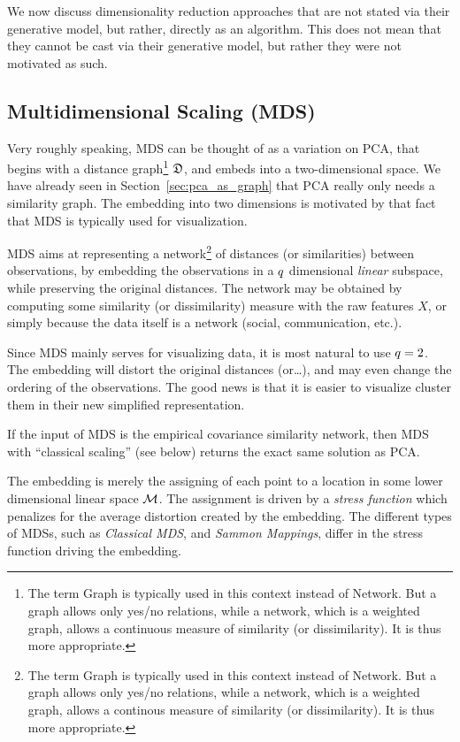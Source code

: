 \documentclass[12pt,a4paper]{article}
\begin{document}
We now discuss dimensionality reduction approaches that are not stated via their generative model, but rather, directly as an algorithm.
This does not mean that they cannot be cast via their generative model, but rather they were not motivated as such.



\subsection{Multidimensional Scaling (MDS)}
\label{sec:mds}

Very roughly speaking, MDS can be thought of as a variation on PCA, that begins with a distance graph\footnote{The term Graph is typically used in this context instead of Network. But a graph allows only yes/no relations, while a network, which is a weighted graph, allows a continuous measure of similarity (or dissimilarity). It is thus more appropriate.} $\mathfrak{D}$, and embeds into a two-dimensional space.
We have already seen in Section~\ref{sec:pca_as_graph} that PCA really only needs a similarity graph. 
The embedding into two dimensions is motivated by that fact that MDS is typically used for visualization. 

MDS aims at representing a network\footnote{The term Graph is typically used in this context instead of Network. But a graph allows only yes/no relations, while a network, which is a weighted graph, allows a continous measure of similarity (or dissimilarity). It is thus more appropriate.} of distances (or similarities) between observations, by embedding the observations in a $q$ dimensional \emph{linear} subspace, while preserving the original distances.
The network may be obtained by computing some similarity (or dissimilarity) measure with the raw features $X$, or simply because the data itself is a network (social, communication, etc.).

Since MDS mainly serves for visualizing data, it is most natural to use $q=2$. 
The embedding will distort the original distances (or\dots), and may even change the ordering of the observations. The good news is that it is easier to visualize \andor cluster them in their new simplified representation. 

If the input of MDS is the empirical covariance similarity network, then MDS with ``classical scaling'' (see below) returns the exact same solution as PCA.

The embedding is merely the assigning of each point to a location in some lower dimensional linear space $\mathcal{M}$. 
The assignment is driven by a \emph{stress function} which penalizes for the average distortion created by the embedding.
The different types of MDSs, such as \emph{Classical MDS}, and \emph{Sammon Mappings}, differ in the stress function driving the embedding.
\end{document}
